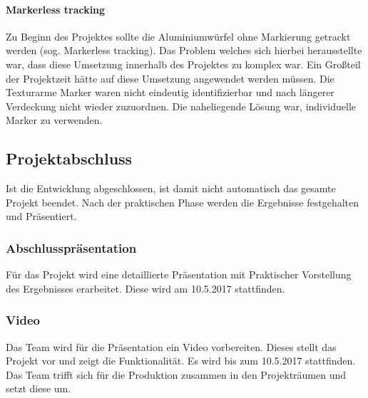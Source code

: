 \paragraph{Markerless tracking}
 Zu Beginn des Projektes sollte die Aluminiumwürfel ohne Markierung getrackt werden (sog. Markerless tracking). Das Problem welches sich hierbei herausstellte war, dass diese Umsetzung innerhalb des Projektes zu komplex war. Ein Großteil der Projektzeit hätte auf diese Umsetzung angewendet werden müssen. Die Texturarme Marker waren nicht eindeutig identifizierbar und nach längerer Verdeckung nicht wieder zuzuordnen. Die naheliegende Lösung war, individuelle Marker zu verwenden.


\subsection{Projektabschluss}
Ist die Entwicklung abgeschlossen, ist damit nicht automatisch das gesamte Projekt beendet. Nach der praktischen Phase werden die Ergebnisse festgehalten und Präsentiert. 
\subsubsection{Abschlusspräsentation}
Für das Projekt wird eine detaillierte Präsentation mit Praktischer Vorstellung des Ergebnisses erarbeitet. Diese wird am 10.5.2017 stattfinden.
 \subsubsection{Video}
Das Team wird für die Präsentation ein Video vorbereiten. Dieses stellt das Projekt vor und zeigt die Funktionalität. Es wird bis zum 10.5.2017 stattfinden. Das Team trifft sich für die Produktion zusammen in den Projekträumen und setzt diese um.



